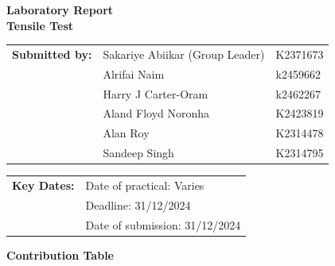\documentclass{article}
\begin{document}
        

    \vspace*{\fill}
    \begin{center}
        \textbf{\Huge Laboratory Report}\\[10pt]
        \LARGE \textbf{Tensile Test}
    \end{center}
    \vspace*{\fill}

    \Large    
    \begin{tabular}{@{}l l l@{}}
        \textbf{Submitted by:} & Sakariye Abiikar (Group Leader)\phantom{ssssss} & K2371673 \\
        & Alrifai Naim & k2459662 \\
        & Harry J Carter-Oram &  k2462267 \\
        & Aland Floyd Noronha & K2423819 \\
        & Alan Roy & K2314478 \\
        & Sandeep Singh & K2314795 \\   
    \end{tabular}
    
    \vspace*{\fill}
    
    \begin{tabular}{@{}l l@{}}
        \textbf{Key Dates:} & Date of practical: Varies\\
        & Deadline: 31/12/2024 \\
        & Date of submission: 31/12/2024\\
    \end{tabular}
    \vspace*{\fill}
    
    \large
    \newpage\noindent\vspace{2em}
    \begin{center}
        \LARGE \textbf{Contribution Table}\\[3em]
    \end{center}
    
\end{document}
